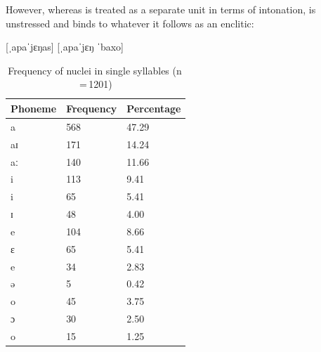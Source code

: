 However, whereas  is treated as a separate unit in terms
of intonation,  is unstressed and binds to whatever it
follows as an enclitic:

\pex
	\a {} [ˌapaˈjɛŋas]
	\a {} [ˌapaˈjɛŋ ˈbaxo]
\xe

\begin{table}\centering
\caption[Frequency of nuclei in single syllables]{Frequency of nuclei in single
syllables (n\,=\,1201)}
\begin{tabu} to 0.67\linewidth{X X[c] X[c]}
\tableheaderfont\toprule
Phoneme
	& Frequency
	& Percentage
	\\
	
\toprule

a
	& 568
	& 47.29\pct
	\\

aɪ
	& 171
	& 14.24\pct
	\\

aː
	& 140
	& 11.66\pct
	\\

\midrule

i
	& 113
	& 9.41\pct
	\\

\rowfont{\scriptsize\itshape}
\raggedleft
i
	& 65
	& 5.41\pct
	\\

\rowfont{\scriptsize\itshape}
\raggedleft
ɪ
	& 48
	& 4.00\pct
	\\

\midrule

e
	& 104
	& 8.66\pct
	\\

\rowfont{\scriptsize\itshape}
\raggedleft
ɛ
	& 65
	& 5.41\pct
	\\

\rowfont{\scriptsize\itshape}
\raggedleft
e
	& 34
	& 2.83\pct
	\\

\rowfont{\scriptsize\itshape}
\raggedleft
ə
	& 5
	& 0.42\pct
	\\

\midrule

o
	& 45
	& 3.75\pct
	\\

\rowfont{\scriptsize\itshape}
\raggedleft
ɔ
	& 30
	& 2.50\pct
	\\

\rowfont{\scriptsize\itshape}
\raggedleft
o
	& 15
	& 1.25\pct
	\\


\end{tabu}
\end{table}

